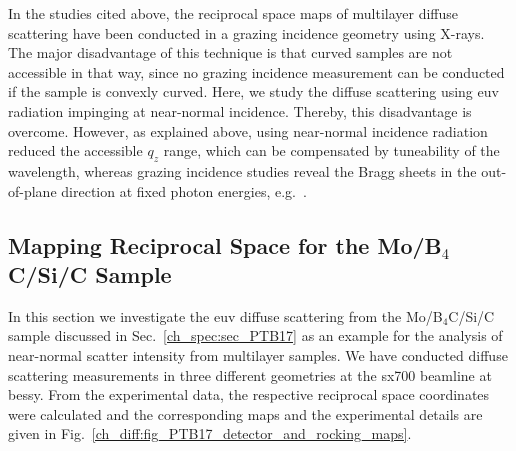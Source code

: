 In the studies cited above, the reciprocal space maps of multilayer diffuse scattering have been conducted in a grazing incidence geometry using X-rays. The major disadvantage of this technique is that curved samples are not accessible in that way, since no grazing incidence measurement can be conducted if the sample is convexly curved. Here, we study the diffuse scattering using \gls{euv} radiation impinging at near-normal incidence. Thereby, this disadvantage is overcome. However, as explained above, using near-normal incidence radiation reduced the accessible $q_z$ range, which can be compensated by tuneability of the wavelength, whereas grazing incidence studies reveal the Bragg sheets in the out-of-plane direction at fixed photon energies, e.g.~\textcite{siffalovic_characterization_2009}.

\subsection{Mapping Reciprocal Space for the Mo/B$_4$C/Si/C Sample}
In this section we investigate the \gls{euv} diffuse scattering from the Mo/B$_4$C/Si/C sample discussed in Sec.~\ref{ch_spec:sec_PTB17} as an example for the analysis of near-normal scatter intensity from multilayer samples. We have conducted diffuse scattering measurements in three different geometries at the \gls{sx700} beamline at \gls{bessy}. From the experimental data, the respective reciprocal space coordinates were calculated and the corresponding maps and the experimental details are given in Fig.~\ref{ch_diff:fig_PTB17_detector_and_rocking_maps}.
